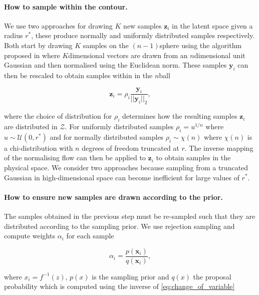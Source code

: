 \documentclass[%
 reprint,
nofootinbib,
 amsmath,amssymb,
 aps,
 prd,
]{revtex4-2}
\newcommand{\nball}[1]{$#1$\nobreakdash\discretionary{-}{-}{-}ball }
\newcommand{\nsphere}[1]{$#1$\nobreakdash\discretionary{-}{-}{-}sphere }
\newcommand{\ndimensional}[1]{$#1$\nobreakdash\discretionary{-}{-}{-}dimensional}
\newcommand{\latent}{\mathcal{Z}}
\renewcommand{\vec}[1]{\boldsymbol{#1}}
\begin{document}
\paragraph{How to sample within the contour.}

We use two approaches for drawing $K$ new samples $\vec{z}_{i}$ in the latent space given a radius $r^{*}$, these produce normally and uniformly distributed samples respectively. Both start by drawing $K$ samples on the \nsphere{(n-1)} using the algorithm proposed in \cite{Muller:1959ANO, Marsaglia:1972} where \ndimensional{K} vectors are drawn from an \ndimensional{n} unit Gaussian and then normalised using the Euclidean norm. These samples $\vec{y}_{i}$ can then be rescaled to obtain samples within in the \nball{n}

\begin{equation}\label{eq:latent_sampling}
    \vec{z}_{i} = \rho_{i} \frac{\vec{y}_{i}}{||\vec{y}_{i}||_{2}},
\end{equation}

where the choice of distribution for $\rho_{i}$ determines how the resulting samples $\vec{z}_{i}$ are distributed in $\latent$. For uniformly distributed samples $\rho_{i} = u^{1/n}$ where $u\sim \mathcal{U}(0, r^{*})$ and for normally distributed samples $\rho_{i} \sim \chi(n)$ where $\chi(n)$ is a chi-distribution with $n$ degrees of freedom truncated at $r$. The inverse mapping of the normalising flow can then be applied to $\vec{z}_{i}$ to obtain samples in the physical space. We consider two approaches because sampling from a truncated Gaussian in high-dimensional space can become inefficient for large values of $r^{*}$.

\paragraph{How to ensure new samples are drawn according to the prior.}

The samples obtained in the previous step must be re-sampled such that they are distributed according to the sampling prior. We use rejection sampling and compute weights $\alpha_{i}$ for each sample

\begin{equation}\label{eq:rejection_sampling}
    \alpha_{i} = \frac{p(\vec{x}_{i})}{q(\vec{x}_{i})},
\end{equation}

where $x_{i} = f^{-1}(z)$, $p(x)$ is the sampling prior and $q(x)$ the proposal probability which is computed using the inverse of \cref{eq:change_of_variable}
\end{document}
